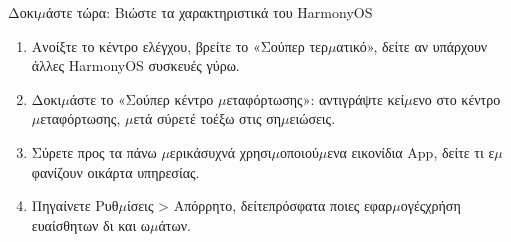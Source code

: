 \begin{tcbpractice}{Δοκι$\mu$άστε τώρα: Βιώστε τα χαρακτηριστικά του HarmonyOS}
\begin{enumerate}
  \item Ανοίξτε το κέντρο ελέγχου, βρείτε το «Σούπερ τερ$\mu$ατικό», δείτε αν υπάρχουν άλλες HarmonyOS συσκευές γύρω.
  \item Δοκι$\mu$άστε το «Σούπερ κέντρο $\mu$εταφόρτωσης»: αντιγράψτε κεί$\mu$ενο στο κέντρο $\mu$εταφόρτωσης, $\mu$ετά σύρετέ τοέξω στις ση$\mu$ειώσεις.
  \item Σύρετε προς τα πάνω $\mu$ερικάσυχνά χρησι$\mu$οποιού$\mu$ενα εικονίδια App, δείτε τι ε$\mu$φανίζουν οικάρτα υπηρεσίας.
  \item Πηγαίνετε Ρυθ$\mu$ίσεις > Απόρρητο, δείτεπρόσφατα ποιες εφαρ$\mu$ογέςχρήση ευαίσθητων δι και ω$\mu$άτων.
\end{enumerate}

\end{tcbpractice}
